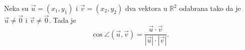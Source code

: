\documentclass[11pt]{article}
\newcommand{\R}{\mathbb{R}}
\begin{document}
	\noindent
	Neka su $ \vec{u} = (x_1, y_1) $ i $ \vec{v} = (x_2, y_2) $ dva vektora u $ \R^2 $ odabrana tako da je $ \vec{u} \neq \vec{0} $ i $ \vec{v} \neq \vec{0} $. Tada je
	\begin{equation*}
		\cos \angle (\vec{u}, \vec{v}) = \frac{\vec{u} \cdot \vec{v}}{|\vec{u}| \cdot |\vec{v}|}.
	\end{equation*}
\end{document}
